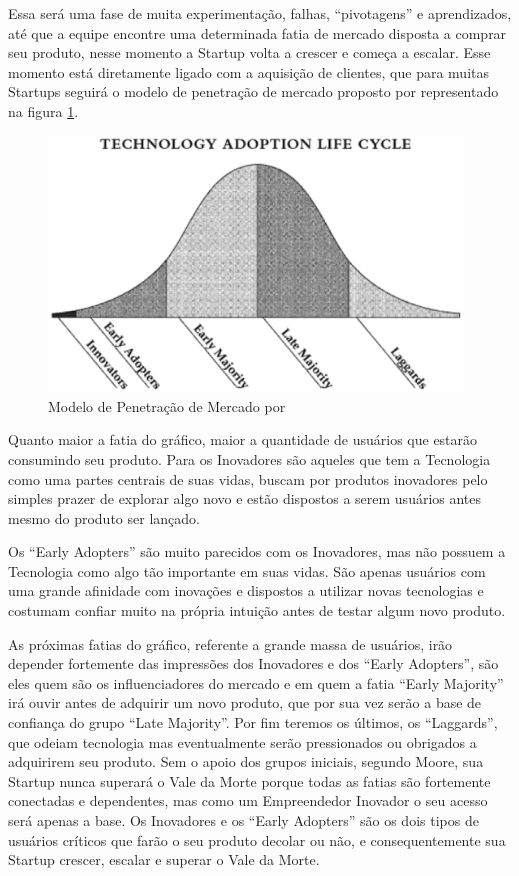 Essa será uma fase de muita experimentação, falhas, ``pivotagens'' e aprendizados, até que a equipe encontre uma determinada fatia de mercado disposta a comprar seu produto, nesse momento a Startup volta a crescer e começa a escalar. Esse momento está diretamente ligado com a aquisição de clientes, que para muitas Startups seguirá o modelo de penetração de mercado proposto por  representado na figura \ref{figure:chasm_curve}.

\begin{figure}[!htb]
\centering
\includegraphics[width=11cm,angle=0]{figuras/chasm_curve}
\caption{Modelo de Penetração de Mercado por \cite{Moore2014}}
\label{figure:chasm_curve}
\end{figure}

Quanto maior a fatia do gráfico, maior a quantidade de usuários que estarão consumindo seu produto. Para  os Inovadores são aqueles que tem a Tecnologia como uma partes centrais de suas vidas, buscam por produtos inovadores pelo simples prazer de explorar algo novo e estão dispostos a serem usuários antes mesmo do produto ser lançado. 

Os ``Early Adopters'' são muito parecidos com os Inovadores, mas não possuem a Tecnologia como algo tão importante em suas vidas. São apenas usuários com uma grande afinidade com inovações e dispostos a utilizar novas tecnologias e costumam confiar muito na própria intuição antes de testar algum novo produto. 

As próximas fatias do gráfico, referente a grande massa de usuários, irão depender fortemente das impressões dos Inovadores e dos ``Early Adopters'', são eles quem são os influenciadores do mercado e em quem a fatia ``Early Majority'' irá ouvir antes de adquirir um novo produto, que por sua vez serão a base de confiança do grupo ``Late Majority''. Por fim teremos os últimos, os ``Laggards'', que odeiam tecnologia mas eventualmente serão pressionados ou obrigados a adquirirem seu produto. Sem o apoio dos grupos iniciais, segundo Moore, sua Startup nunca superará o Vale da Morte porque todas as fatias são fortemente conectadas e dependentes, mas como um Empreendedor Inovador o seu acesso será apenas a base. Os Inovadores e os ``Early Adopters'' são os dois tipos de usuários críticos que farão o seu produto decolar ou não, e consequentemente sua Startup crescer, escalar e superar o Vale da Morte.

